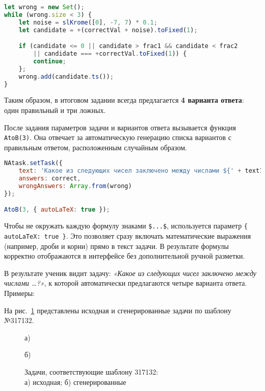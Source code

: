 \begin{lstlisting}[language=JavaScript]
let wrong = new Set();
while (wrong.size < 3) {
    let noise = slKrome([0], -7, 7) * 0.1;
    let candidate = +(correctVal + noise).toFixed(1);

    if (candidate <= 0 || candidate > frac1 && candidate < frac2 
        || candidate === +correctVal.toFixed(1)) {
        continue;
    };
    wrong.add(candidate.ts());
}
\end{lstlisting}

Таким образом, в итоговом задании всегда предлагается \textbf{4 варианта ответа}: один правильный и три ложных.  

После задания параметров задачи и вариантов ответа вызывается функция \verb|AtoB(3)|. 
Она отвечает за автоматическую генерацию списка вариантов с правильным ответом, расположенным случайным образом.  

\begin{lstlisting}[language=JavaScript]
NAtask.setTask({
    text: 'Какое из следующих чисел заключено между числами ${' + text1 + '}$ и ${' + text2 + '}$?',
    answers: correct,
    wrongAnswers: Array.from(wrong)
});

AtoB(3, { autoLaTeX: true });
\end{lstlisting}

Чтобы не окружать каждую формулу знаками \verb|$...$|, используется параметр \verb|{ autoLaTeX: true }|. 
Это позволяет сразу включать математические выражения (например, дроби и корни) прямо в текст задачи. 
В результате формулы корректно отображаются в интерфейсе без дополнительной ручной разметки.  

В результате ученик видит задачу: 
\textit{«Какое из следующих чисел заключено между числами …?»}, 
к которой автоматически предлагаются четыре варианта ответа.  
Примеры:



На рис.~\ref{ris:317132} представлены исходная и сгенерированные задачи по шаблону №317132.

\begin{figure}[h]
\begin{minipage}[h]{0.8\linewidth}
 а) \\
\end{minipage}
\vfill
\begin{minipage}[h]{0.95\linewidth}
 б) \\
\end{minipage}
\caption{Задачи, соответствующие шаблону 317132:
\\
а) исходная; б) сгенерированные}
\label{ris:317132}
\end{figure}

